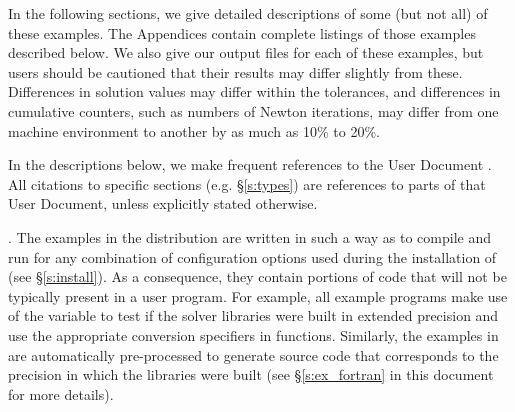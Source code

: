 \vspace{0.2in}\noindent 
In the following sections, we give detailed descriptions of some (but
not all) of these examples.  The Appendices contain complete listings
of those examples described below.  We also give our output files for
each of these examples, but users should be cautioned that their
results may differ slightly from these.  Differences in solution
values may differ within the tolerances, and differences in cumulative
counters, such as numbers of Newton iterations, may differ
from one machine environment to another by as much as 10\% to 20\%.

In the descriptions below, we make frequent references to the {\kinsol}
User Document \cite{kinsol2.4.0_ug}.  All citations to specific sections
(e.g. \S\ref{s:types}) are references to parts of that User Document, unless
explicitly stated otherwise.

\vspace{0.2in}. 
The examples in the {\kinsol} distribution are written in such a way as
to compile and run for any combination of configuration options used during
the installation of {\sundials} (see \S\ref{s:install}). As a consequence,
they contain portions of code that will not be typically present in a
user program. For example, all {\C} example programs make use of the
variable  to test if the solver libraries
were built in extended precision and use the appropriate conversion 
specifiers in  functions. Similarly, the {\F} examples in
{\fkinsol} are automatically pre-processed to generate source code that
corresponds to the precision in which the {\kinsol} libraries were built
(see \S\ref{s:ex_fortran} in this document for more details).

